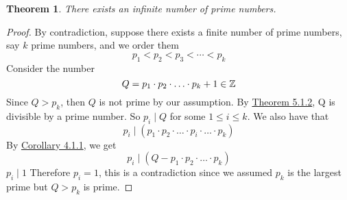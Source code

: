 \documentclass[openany]{report}
\newtheorem{theorem}{Theorem}[section]
\begin{document}
\begin{theorem}\label{theorem5.1.3}
There exists an infinite number of prime numbers.    
\end{theorem}
\begin{proof}
    By contradiction, suppose there exists a finite number of prime numbers, say $k$ prime numbers, and we order them 
    $$p_1 < p_2 < p_3 < \cdots < p_k$$
    Consider the number 
    $$Q = p_1 \cdot p_2 \cdot \ldots \cdot p_k + 1 \in \mathbb{Z}$$
    Since $Q > p_k$, then $Q$ is not prime by our assumption. By \hyperref[theorem5.1.2]{Theorem 5.1.2}, Q is divisible by a prime number. So $p_i \mid Q$ for some $1 \leq i \leq k$. We also have that 
    $$p_i \mid (p_1\cdot p_2 \cdot \ldots \cdot p_i \cdot \ldots \cdot p_k)$$
    By \hyperref[corollary4.1.1]{Corollary 4.1.1}, we get
    $$p_i \mid (Q - p_1 \cdot p_2 \cdot \ldots \cdot p_k)$$
    $p_i \mid 1$
    Therefore $p_i = 1$, this is a contradiction since we assumed $p_k$ is the largest prime but $Q > p_k$ is prime. 
\end{proof}
\end{document}

